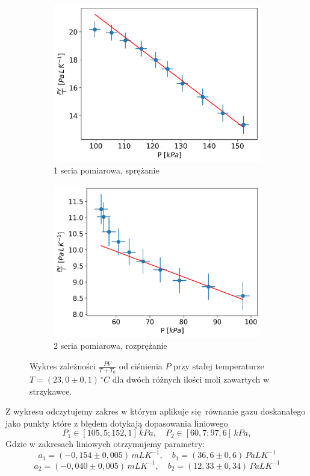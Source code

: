 \documentclass[12pt]{article}
\begin{document}
\begin{figure}[H]
    \centering
    \begin{subfigure}{0.47\textwidth}
        \includegraphics[width=\linewidth]{izotermic_0}
        \caption{1 seria pomiarowa, sprężanie}
    \end{subfigure}\hfill
    \begin{subfigure}{0.47\textwidth}
        \includegraphics[width=\linewidth]{izotermic_1}
        \caption{2 seria pomiarowa, rozprężanie}
    \end{subfigure}
    \caption{Wykres zależności \(\frac{PV}{T + T_0}\) od ciśnienia \(P\) przy stałej temperaturze \(T = (23{,}0 \pm 0{,}1) \, ^\circ C\) dla dwóch różnych ilości moli zawartych w strzykawce.}
    \label{fig:izotermic}
\end{figure}
Z wykresu odczytujemy zakres w którym aplikuje się równanie gazu doskanałego jako punkty które z błędem dotykają dopasowania liniowego
\[
    P_1 \in [105{,}5; 152{,}1] \, kPa, \quad P_2 \in [60{,}7; 97{,}6] \, kPa,
\]
Gdzie w zakresach liniowych otrzymujemy parametry:
\[
    a_1 = (-0{,}154 \pm 0{,}005) \, mL K^{-1}, \quad b_1 = (36{,}6 \pm 0{,}6) \, Pa L K^{-1}
\]
\[
    a_2 = (-0{,}040 \pm 0{,}005) \, mL K^{-1}, \quad b_2 = (12{,}33 \pm 0{,}34) \, Pa L K^{-1}
\]
\end{document}
